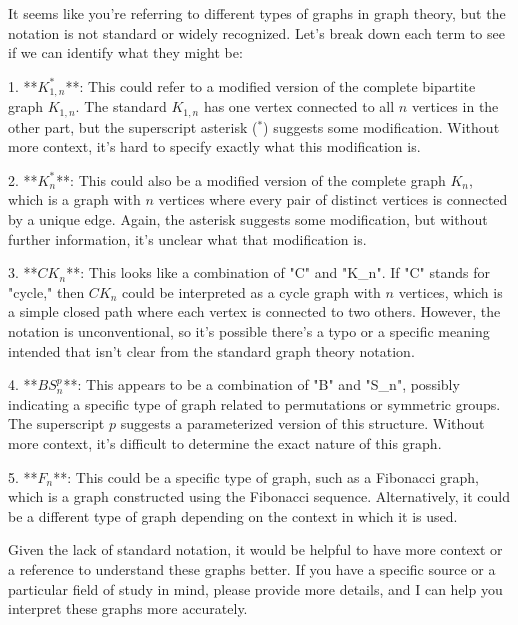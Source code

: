 It seems like you're referring to different types of graphs in graph theory, but the notation is not standard or widely recognized. Let's break down each term to see if we can identify what they might be:

1. **\( K_{1,n}^* \)**: This could refer to a modified version of the complete bipartite graph \( K_{1,n} \). The standard \( K_{1,n} \) has one vertex connected to all \( n \) vertices in the other part, but the superscript asterisk (\( ^* \)) suggests some modification. Without more context, it's hard to specify exactly what this modification is.

2. **\( K_n^* \)**: This could also be a modified version of the complete graph \( K_n \), which is a graph with \( n \) vertices where every pair of distinct vertices is connected by a unique edge. Again, the asterisk suggests some modification, but without further information, it's unclear what that modification is.

3. **\( C\!K_n \)**: This looks like a combination of "C" and "K_n". If "C" stands for "cycle," then \( C\!K_n \) could be interpreted as a cycle graph with \( n \) vertices, which is a simple closed path where each vertex is connected to two others. However, the notation is unconventional, so it's possible there's a typo or a specific meaning intended that isn't clear from the standard graph theory notation.

4. **\( B\!S_n^p \)**: This appears to be a combination of "B" and "S_n", possibly indicating a specific type of graph related to permutations or symmetric groups. The superscript \( p \) suggests a parameterized version of this structure. Without more context, it's difficult to determine the exact nature of this graph.

5. **\( F_n \)**: This could be a specific type of graph, such as a Fibonacci graph, which is a graph constructed using the Fibonacci sequence. Alternatively, it could be a different type of graph depending on the context in which it is used.

Given the lack of standard notation, it would be helpful to have more context or a reference to understand these graphs better. If you have a specific source or a particular field of study in mind, please provide more details, and I can help you interpret these graphs more accurately.